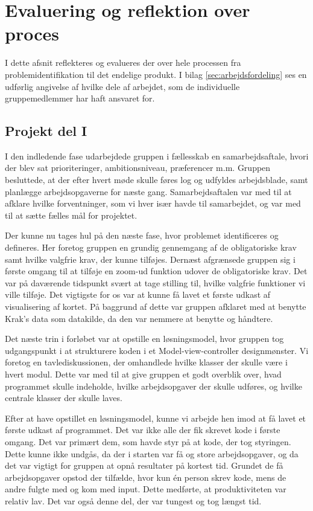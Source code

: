 \section{Evaluering og reflektion over proces}
\label{sec:evaluering_og_reflektion_over_proces}

I dette afsnit reflekteres og evalueres der over hele processen fra problemidentifikation til det endelige produkt. I bilag \ref{sec:arbejdsfordeling} ses en udførlig angivelse af hvilke dele af arbejdet, som de individuelle gruppemedlemmer har haft ansvaret for.

\subsection{Projekt del I}

I den indledende fase udarbejdede gruppen i fællesskab en samarbejdsaftale, hvori der blev sat prioriteringer, ambitionsniveau, præferencer m.m. Gruppen besluttede, at der efter hvert møde skulle føres log og udfyldes arbejdsblade, samt planlægge arbejdsopgaverne for næste gang. Samarbejdsaftalen var med til at afklare hvilke forventninger, som vi hver især havde til samarbejdet, og var med til at sætte fælles mål for projektet.

Der kunne nu tages hul på den næste fase, hvor problemet identificeres og defineres. Her foretog gruppen en grundig gennemgang af de obligatoriske krav samt hvilke valgfrie krav, der kunne tilføjes. Dernæst afgrænsede gruppen sig i første omgang til at tilføje en zoom-ud funktion udover de obligatoriske krav. Det var på daværende tidspunkt svært at tage stilling til, hvilke valgfrie funktioner vi ville tilføje. Det vigtigste for os var at kunne få lavet et første udkast af visualisering af kortet. På baggrund af dette var gruppen afklaret med at benytte Krak's data som datakilde, da den var nemmere at benytte og håndtere.   

Det næste trin i forløbet var at opstille en løsningsmodel, hvor gruppen tog udgangspunkt i at strukturere koden i et Model-view-controller designmønster. Vi foretog en tavlediskussionen, der omhandlede hvilke klasser der skulle være i hvert modul. Dette var med til at give gruppen et godt overblik over, hvad programmet skulle indeholde, hvilke arbejdsopgaver der skulle udføres, og hvilke centrale klasser der skulle laves. 

Efter at have opstillet en løsningsmodel, kunne vi arbejde hen imod at få lavet et første udkast af programmet. Det var ikke alle der fik skrevet kode i første omgang. Det var primært dem, som havde styr på at kode, der tog styringen. Dette kunne ikke undgås, da der i starten var få og store arbejdsopgaver, og da det var vigtigt for gruppen at opnå resultater på kortest tid. Grundet de få arbejdsopgaver opstod der tilfælde, hvor kun én person skrev kode, mens de andre fulgte med og kom med input. Dette medførte, at produktiviteten var relativ lav. Det var også denne del, der var tungest og tog længst tid. 


